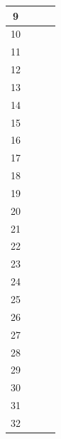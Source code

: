 \documentclass[11pt, a4paper]{article}
\begin{document}
\begin{landscape}
\begin{longtable}{|c|c|c|c|}
       9&         &                 &                     \\ \hline 
       10&         &                 &                    \\ \hline 
       11&         &                 &                     \\ \hline 
       12&         &                 &                    \\ \hline 
       13&         &                 &                     \\ \hline 
       14&         &                 &                    \\ \hline
       15&         &                 &                     \\ \hline 
       16&         &                 &                    \\ \hline 
       17&         &                 &                     \\ \hline 
       18&         &                 &                    \\ \hline 
       19&         &                 &                     \\ \hline 
       20&         &                 &                    \\ \hline 
       21&         &                 &                     \\ \hline
       22&         &                 &                    \\ \hline
       23&         &                 &                     \\ \hline
       24&         &                 &                    \\ \hline
       25&         &                 &                     \\ \hline
       26&         &                 &                    \\ \hline
       27&         &                 &                     \\ \hline
       28&         &                 &                    \\ \hline
       29&         &                 &                     \\ \hline
       30&         &                 &                    \\ \hline
       31&         &                 &                     \\ \hline
       32&         &                 &                    \\ \hline

\end{longtable}
\end{landscape}
\end{document}

